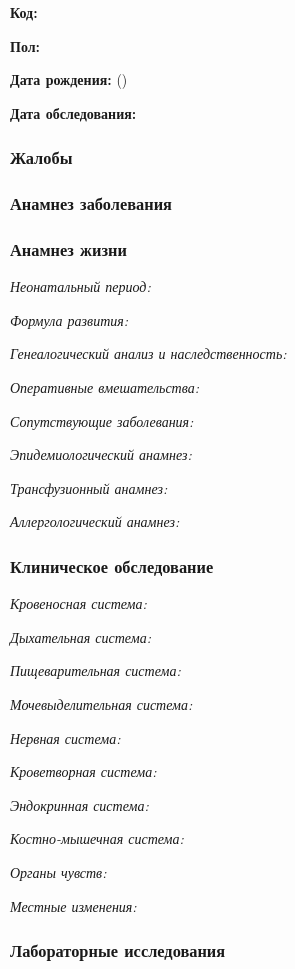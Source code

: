 \documentclass[a4paper,14pt]{extarticle}
\begin{document}
\textbf{Код:} 

\textbf{Пол:}

\textbf{Дата рождения:}  ()

\textbf{Дата обследования:} 

\subsubsection*{Жалобы}

\subsubsection*{Анамнез заболевания}

\subsubsection*{Анамнез жизни}

\emph{Неонатальный период:}

\emph{Формула развития:}

\emph{Генеалогический анализ и наследственность:}

\emph{Оперативные вмешательства:}

\emph{Сопутствующие заболевания:}

\emph{Эпидемиологический анамнез:}

\emph{Трансфузионный анамнез:}

\emph{Аллергологический анамнез:}

\subsubsection*{Клиническое обследование}

\emph{Кровеносная система:}

\emph{Дыхательная система:}

\emph{Пищеварительная система:}

\emph{Мочевыделительная система:}

\emph{Нервная система:} 

\emph{Кроветворная система:}

\emph{Эндокринная система:}

\emph{Костно-мышечная система:}

\emph{Органы чувств:}

\emph{Местные изменения:}

\subsubsection*{Лабораторные исследования}
\end{document}
